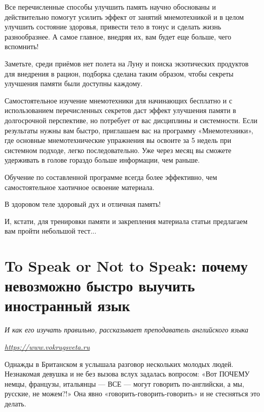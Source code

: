 Все перечисленные способы улучшить память научно обоснованы и действительно помогут усилить эффект от занятий мнемотехникой и в целом улучшить состояние здоровья, привести тело в тонус и сделать жизнь разнообразнее. А самое главное, внедряя их, вам будет еще больше, чего вспомнить!

Заметьте, среди приёмов нет полета на Луну и поиска экзотических продуктов для внедрения в рацион, подборка сделана таким образом, чтобы секреты улучшения памяти были доступны каждому.

Самостоятельное изучение мнемотехники для начинающих бесплатно и с использованием перечисленных секретов даст эффект улучшения памяти в долгосрочной перспективе, но потребует от вас дисциплины и системности. Если результаты нужны вам быстро, приглашаем вас на программу «Мнемотехники», где основные мнемотехнические упражнения вы освоите за 5 недель при системном подходе, легко последовательно. Уже через месяц вы сможете удерживать в голове гораздо больше информации, чем раньше.

Обучение по составленной программе всегда более эффективно, чем самостоятельное хаотичное освоение материала.

В здоровом теле здоровый дух и отличная память!

И, кстати, для тренировки памяти и закрепления материала статьи предлагаем вам пройти небольшой тест...


\newpage
\section[Почему невозможно быстро выучить иностранный язык]{To Speak or Not to Speak: почему невозможно быстро выучить иностранный язык}

\textit{И как его изучать правильно, рассказывает преподаватель английского языка}

{\it \url{https://www.vokrugsveta.ru}}


Однажды в Британском  я услышала разговор нескольких молодых людей. Незнакомая девушка  и не без вызова вслух задалась вопросом: «Вот ПОЧЕМУ немцы, французы, итальянцы — ВСЕ — могут говорить по-английски, а мы, русские, не можем?!» Она явно  «говорить-говорить-говорить» и не стесняться это делать.

